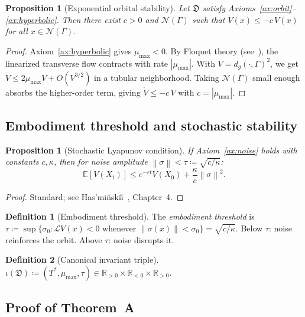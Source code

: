 \documentclass[12pt, oneside]{book}
\theoremstyle{plain}
\newtheorem{proposition}[theorem]{Proposition}
\theoremstyle{definition}
\newtheorem{definition}{Definition}[section]
\theoremstyle{remark}
\newcommand{\R}{\mathbb{R}}
\newcommand{\dm}{\mathfrak{D}}
\newcommand{\Orb}{\Gamma}
\newcommand{\cN}{\mathcal{N}}
\newcommand{\cL}{\mathcal{L}}
\newcommand{\dg}{d_g}
\newcommand{\norm}[1]{\left\|#1\right\|}
\newcommand{\abs}[1]{\left|#1\right|}
\begin{document}
\begin{proposition}[Exponential orbital stability]\label{prop:orbital}
Let $\dm$ satisfy Axioms~\ref{ax:orbit}--\ref{ax:hyperbolic}. Then
there exist $c>0$ and $\cN(\Orb)$ such that
$\dot V(x)\le -c\,V(x)$ for all $x\in\cN(\Orb)$.
\end{proposition}

\begin{proof}
Axiom~\ref{ax:hyperbolic} gives $\mu_{\max}<0$. By Floquet theory
(see~\cite{GH,Shub}), the linearized transverse flow contracts with
rate $\abs{\mu_{\max}}$. With $V=\dg(\cdot,\Orb)^2$, we get
$\dot V\le 2\mu_{\max}V+O(V^{3/2})$ in a tubular neighborhood.
Taking $\cN(\Orb)$ small enough absorbs the higher-order term,
giving $\dot V\le -c\,V$ with $c=\abs{\mu_{\max}}$.
\end{proof}

\subsection{Embodiment threshold and stochastic stability}

\begin{proposition}[Stochastic Lyapunov condition]\label{prop:stoch}
If Axiom~\ref{ax:noise} holds with constants $c,\kappa$, then for
noise amplitude $\norm\sigma<\tau\coloneqq\sqrt{c/\kappa}$:
\[
  \mathbb{E}[V(X_t)]\le e^{-ct}V(X_0)+\frac{\kappa}{c}\norm\sigma^2.
\]
\end{proposition}

\begin{proof}
Standard; see Has'mi\u{n}ski\u{\i}~\cite{Hasminski}, Chapter~4.
\end{proof}

\begin{definition}[Embodiment threshold]\label{def:threshold}
The \emph{embodiment threshold} is
$\tau\coloneqq\sup\{\sigma_0:\cL V(x)<0\text{ whenever }
\norm{\sigma(x)}<\sigma_0\}=\sqrt{c/\kappa}$.
Below $\tau$: noise reinforces the orbit. Above $\tau$: noise
disrupts it.
\end{definition}

\begin{definition}[Canonical invariant triple]\label{def:triple}
$\iota(\dm)\coloneqq(T^*,\mu_{\max},\tau)\in
\R_{>0}\times\R_{<0}\times\R_{>0}$.
\end{definition}

\subsection{Proof of Theorem~A}
\end{document}
